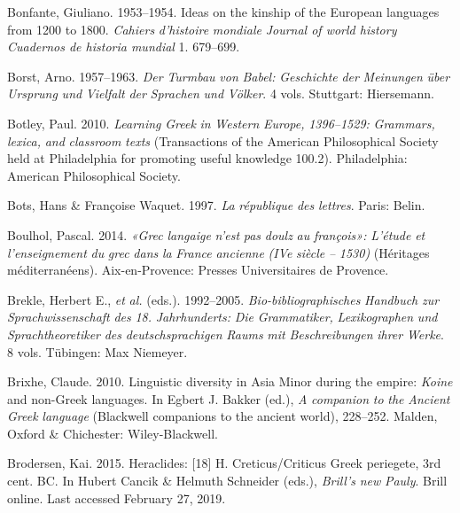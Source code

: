 Bonfante, Giuliano. 1953–1954. Ideas on the kinship of the European languages from 1200 to 1800. \textit{Cahiers} \textit{d’histoire} \textit{mondiale} \textit{{\textbar} Journal of world history {\textbar} Cuadernos de historia mundial} 1. 679–699.

Borst, Arno. 1957–1963. \textit{Der} \textit{Turmbau} \textit{von} \textit{Babel:} \textit{Geschichte} \textit{der} \textit{Meinungen} \textit{über} \textit{Ursprung} \textit{und} \textit{Vielfalt} \textit{der} \textit{Sprachen} \textit{und} \textit{Völker}. 4 vols. Stuttgart: Hiersemann.

Botley, Paul. 2010. \textit{Learning} \textit{Greek} \textit{in} \textit{Western} \textit{Europe,} \textit{1396–1529:} \textit{Grammars,} \textit{lexica,} \textit{and} \textit{classroom} \textit{texts} (Transactions of the American Philosophical Society held at Philadelphia for promoting useful knowledge 100.2). Philadelphia: American Philosophical Society.

Bots, Hans \& Françoise Waquet. 1997. \textit{La} \textit{république} \textit{des} \textit{lettres}. Paris: Belin.

Boulhol, Pascal. 2014. \textit{«Grec} \textit{langaige} \textit{n’est} \textit{pas} \textit{doulz} \textit{au} \textit{françois»:} \textit{L’étude} \textit{et} \textit{l’enseignement} \textit{du} \textit{grec} \textit{dans} \textit{la} \textit{France} \textit{ancienne} \textit{(IVe} \textit{siècle} \textit{–} \textit{1530)} (Héritages méditerranéens). Aix-en-Provence: Presses Universitaires de Provence.

Brekle, Herbert E., \textit{et} \textit{al.} (eds.). 1992–2005. \textit{Bio-bibliographisches} \textit{Handbuch} \textit{zur} \textit{Sprachwissenschaft} \textit{des} \textit{18.} \textit{Jahrhunderts:} \textit{Die} \textit{Grammatiker,} \textit{Lexikographen} \textit{und} \textit{Sprachtheoretiker} \textit{des} \textit{deutschsprachigen} \textit{Raums} \textit{mit} \textit{Beschreibungen} \textit{ihrer} \textit{Werke}. 8 vols. Tübingen: Max Niemeyer.

Brixhe, Claude. 2010. Linguistic diversity in Asia Minor during the empire: \textit{Koine} and non-Greek languages. In Egbert J. Bakker (ed.), \textit{A} \textit{companion} \textit{to} \textit{the} \textit{Ancient} \textit{Greek} \textit{language} (Blackwell companions to the ancient world), 228–252. Malden, Oxford \& Chichester: Wiley-Blackwell.

Brodersen, Kai. 2015. Heraclides: [18] H. Creticus/Criticus Greek periegete, 3rd cent. BC. In Hubert Cancik \& Helmuth Schneider (eds.), \textit{Brill’s} \textit{new} \textit{Pauly}. Brill online. Last accessed February 27, 2019.

